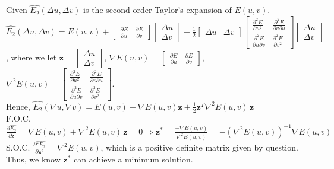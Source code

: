\documentclass[a4paper,12pt]{article}
\begin{document}
\section{}
Given $\widehat{E_{2}}(\Delta u, \Delta v)$ is the second-order Taylor's expansion of $E(u,v)$. \\
$\widehat{E_{2}}(\Delta  u, \Delta v)= E(u,v) + \begin{bmatrix}\frac{\partial E}{\partial u} & \frac{\partial E}{\partial v}\end{bmatrix} \begin{bmatrix}\Delta u\\ \Delta v \end{bmatrix} + \frac{1}{2} \begin{bmatrix} \Delta u& \Delta v \end{bmatrix} \begin{bmatrix}
\frac{\partial^2 E}{\partial u^2} & \frac{\partial^2 E}{\partial v \partial u} \\ 
\frac{\partial^2 E}{\partial u \partial v}  & \frac{\partial^2 E}{\partial v^2}\end{bmatrix} \begin{bmatrix}
\Delta u \\ \Delta v\end{bmatrix}$, where we let $\mathbf{z}=\begin{bmatrix}\Delta u\\ \Delta v\end{bmatrix}$, $\nabla E(u,v)=\begin{bmatrix}\frac{\partial E}{\partial u} & \frac{\partial E}{\partial v}\end{bmatrix}$, $\nabla^2 E(u,v) = \begin{bmatrix}
\frac{\partial^2 E}{\partial u^2} & \frac{\partial^2 E}{\partial v \partial u} \\ 
\frac{\partial^2 E}{\partial u \partial v}  & \frac{\partial^2 E}{\partial v^2}
\end{bmatrix}$. \\
\newline
Hence, $\widehat{E_{2}}(\nabla u, \nabla v)=E(u,v) + \nabla E(u,v) \mathbf{z} + \frac{1}{2} \mathbf{z}^{T} \nabla^2 E(u,v) \, \mathbf{z}$ \\
F.O.C. 
$\frac{\partial \widehat{E_{2}}}{\partial \mathbf{z}}=\nabla E(u,v) + \nabla^2 E(u,v) \, \mathbf{z}=0 \Rightarrow \mathbf{z}^{*}=\frac{-\nabla E(u,v)}{\nabla^2 E(u,v)}= -(\nabla^2 E(u,v))^{-1} \nabla E(u,v)$ \\
S.O.C.
$\frac{\partial^2 \widehat{E_{2}}}{\partial \mathbf{z}^{2}}=\nabla^2 E(u,v)$, which is a positive definite matrix given by question. Thus, we know $\mathbf{z}^{*}$ can achieve a minimum solution.
\end{document}
